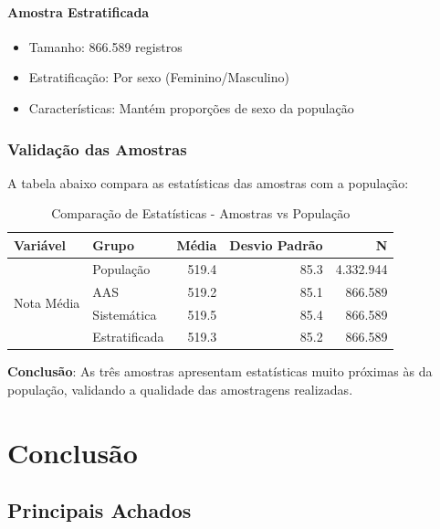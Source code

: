\documentclass[12pt,a4paper]{article}
\begin{document}
\paragraph{Amostra Estratificada}

\begin{itemize}
    \item Tamanho: 866.589 registros
    \item Estratificação: Por sexo (Feminino/Masculino)
    \item Características: Mantém proporções de sexo da população
\end{itemize}

\subsubsection{Validação das Amostras}

A tabela abaixo compara as estatísticas das amostras com a população:

\begin{table}[H]
\centering
\begin{tabular}{|l|l|r|r|r|}
\hline
\textbf{Variável} & \textbf{Grupo} & \textbf{Média} & \textbf{Desvio Padrão} & \textbf{N} \\
\hline
\multirow{4}{*}{Nota Média} & População & 519.4 & 85.3 & 4.332.944 \\
\cline{2-5}
 & AAS & 519.2 & 85.1 & 866.589 \\
\cline{2-5}
 & Sistemática & 519.5 & 85.4 & 866.589 \\
\cline{2-5}
 & Estratificada & 519.3 & 85.2 & 866.589 \\
\hline
\end{tabular}
\caption{Comparação de Estatísticas - Amostras vs População}
\end{table}

\textbf{Conclusão}: As três amostras apresentam estatísticas muito próximas às da população, validando a qualidade das amostragens realizadas.

\newpage

\section{Conclusão}

\subsection{Principais Achados}
\end{document}
